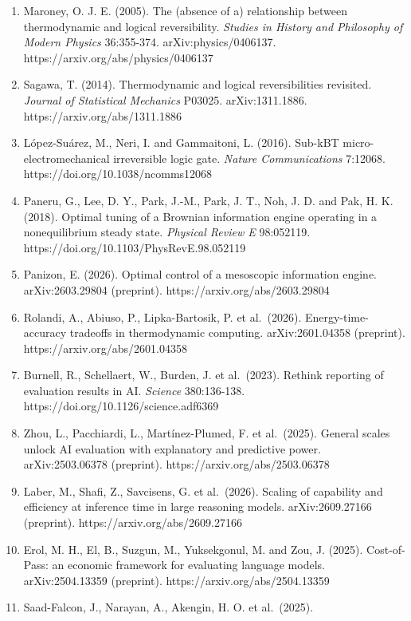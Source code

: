 \documentclass[
  10pt,
]{article}
\newcounter{none} %
\begin{document}
\begin{enumerate}
{  of Modern Physics} 36:375-411.
  https://doi.org/10.1016/j.shpsb.2004.12.002
\item
  Maroney, O. J. E. (2005). The (absence of a) relationship between
  thermodynamic and logical reversibility. \emph{Studies in History and
  Philosophy of Modern Physics} 36:355-374. arXiv:physics/0406137.
  https://arxiv.org/abs/physics/0406137
\item
  Sagawa, T. (2014). Thermodynamic and logical reversibilities
  revisited. \emph{Journal of Statistical Mechanics} P03025.
  arXiv:1311.1886. https://arxiv.org/abs/1311.1886
\item
  López-Suárez, M., Neri, I. and Gammaitoni, L. (2016). Sub-kBT
  micro-electromechanical irreversible logic gate. \emph{Nature
  Communications} 7:12068. https://doi.org/10.1038/ncomms12068
\item
  Paneru, G., Lee, D. Y., Park, J.-M., Park, J. T., Noh, J. D. and Pak,
  H. K. (2018). Optimal tuning of a Brownian information engine
  operating in a nonequilibrium steady state. \emph{Physical Review E}
  98:052119. https://doi.org/10.1103/PhysRevE.98.052119
\item
  Panizon, E. (2026). Optimal control of a mesoscopic information
  engine. arXiv:2603.29804 (preprint). https://arxiv.org/abs/2603.29804
\item
  Rolandi, A., Abiuso, P., Lipka-Bartosik, P. et al.~(2026).
  Energy-time-accuracy tradeoffs in thermodynamic computing.
  arXiv:2601.04358 (preprint). https://arxiv.org/abs/2601.04358
\item
  Burnell, R., Schellaert, W., Burden, J. et al.~(2023). Rethink
  reporting of evaluation results in AI. \emph{Science} 380:136-138.
  https://doi.org/10.1126/science.adf6369
\item
  Zhou, L., Pacchiardi, L., Martínez-Plumed, F. et al.~(2025). General
  scales unlock AI evaluation with explanatory and predictive power.
  arXiv:2503.06378 (preprint). https://arxiv.org/abs/2503.06378
\item
  Laber, M., Shafi, Z., Savcisens, G. et al.~(2026). Scaling of
  capability and efficiency at inference time in large reasoning models.
  arXiv:2609.27166 (preprint). https://arxiv.org/abs/2609.27166
\item
  Erol, M. H., El, B., Suzgun, M., Yuksekgonul, M. and Zou, J. (2025).
  Cost-of-Pass: an economic framework for evaluating language models.
  arXiv:2504.13359 (preprint). https://arxiv.org/abs/2504.13359
\item
  Saad-Falcon, J., Narayan, A., Akengin, H. O. et al.~(2025).

\end{enumerate}
\end{document}
